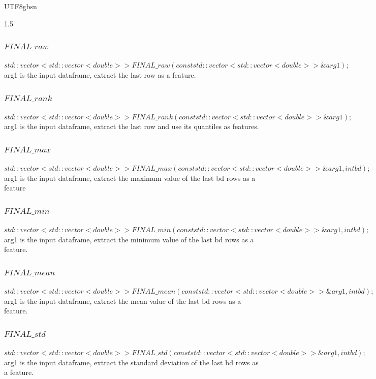 \documentclass{article}
\begin{document}
\begin{CJK}{UTF8}{gbsn}
\begin{spacing}{1.5}
\subsubsection{$FINAL\_raw$}
$std::vector<std::vector<double>> FINAL\_raw(const std::vector<std::vector<double>> \&arg1) ;$\\
arg1 is the input dataframe, extract the last row as a feature.\\

\subsubsection{$FINAL\_rank$}
$std::vector<std::vector<double>> FINAL\_rank(const std::vector<std::vector<double>> \&arg1) ;$\\
arg1 is the input dataframe, extract the last row and use its quantiles as features.\\
\subsubsection{$FINAL\_max$}
$std::vector<std::vector<double>> FINAL\_max(const std::vector<std::vector<double>> \&arg1, int bd) ;$\\
arg1 is the input dataframe, extract the maximum value of the last bd rows as a feature\\

\subsubsection{$FINAL\_min$}
$std::vector<std::vector<double>> FINAL\_min(const std::vector<std::vector<double>> \&arg1, int bd) ;$\\
arg1 is the input dataframe, extract the minimum value of the last bd rows as a feature.
\subsubsection{$FINAL\_mean$}
$std::vector<std::vector<double>> FINAL\_mean(const std::vector<std::vector<double>> \&arg1, int bd) ;$\\
arg1 is the input dataframe, extract the mean value of the last bd rows as a feature.

\subsubsection{$FINAL\_std$}
$std::vector<std::vector<double>> FINAL\_std(const std::vector<std::vector<double>> \&arg1, int bd) ;$\\
arg1 is the input dataframe, extract the standard deviation of the last bd rows as a feature.

\end{spacing}
\end{CJK}
\end{document}
